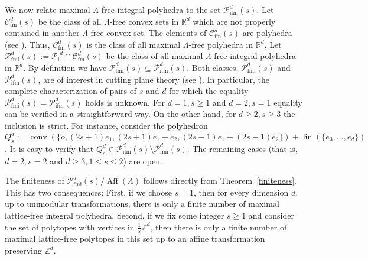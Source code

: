 \documentclass[a4paper]{article}
\theoremstyle{plain}
\begin{document}
We now relate maximal $\Lambda$-free integral polyhedra to
the set ${{\mathcal{P}}_{{\mathop{\mathrm{{ifm}}}}}^{{d}}({s})}$.
Let ${{\mathcal{C}}_{{\mathop{\mathrm{{fm}}}}}^{{d}}({s})}$ be the class of all $\Lambda$-free convex
sets in ${\mathbb{R}}^d$ which are not properly contained in
another $\Lambda$-free convex set.
The elements of ${{\mathcal{C}}_{{\mathop{\mathrm{{fm}}}}}^{{d}}({s})}$ are polyhedra (see
\cite[Proposition\,3.3]{Lovasz89}).
Thus, ${{\mathcal{C}}_{{\mathop{\mathrm{{fm}}}}}^{{d}}({s})}$ is the class of all maximal
$\Lambda$-free polyhedra in ${\mathbb{R}}^d$.
Let ${{\mathcal{P}}_{{\mathop{\mathrm{{fmi}}}}}^{{d}}({s})} := {{\mathcal{P}}_{{\mathop{\mathrm{{i}}}}}}^d \cap {{\mathcal{C}}_{{\mathop{\mathrm{{fm}}}}}^{{d}}({s})}$ be the class of
all maximal $\Lambda$-free integral polyhedra in ${\mathbb{R}}^d$.
By definition we have ${{\mathcal{P}}_{{\mathop{\mathrm{{fmi}}}}}^{{d}}({s})} \subseteq {{\mathcal{P}}_{{\mathop{\mathrm{{ifm}}}}}^{{d}}({s})}$.
Both classes, ${{\mathcal{P}}_{{\mathop{\mathrm{{fmi}}}}}^{{d}}({s})}$ and ${{\mathcal{P}}_{{\mathop{\mathrm{{ifm}}}}}^{{d}}({s})}$, are of
interest in cutting plane theory (see
\cite{DelPiaWeismantel10}).
In particular, the complete characterization of pairs of $s$
and $d$ for which the equality ${{\mathcal{P}}_{{\mathop{\mathrm{{fmi}}}}}^{{d}}({s})} = {{\mathcal{P}}_{{\mathop{\mathrm{{ifm}}}}}^{{d}}({s})}$
holds is unknown.
For $d=1, s \ge 1$ and $d=2, s=1$ equality can be verified
in a straightforward way.
On the other hand, for $d \ge 2, s \ge 3$ the inclusion is
strict.
For instance, consider the polyhedron
$Q^d_s := {{\mathop{\mathrm{{conv}}}}}(\{o, (2s+1) e_1, (2s+1) e_1 + e_2,
(2s-1) e_1 + (2s-1) e_2\}) + {{\mathop{\mathrm{{lin}}}}}(\{e_3, \dots, e_d\})$.
It is easy to verify that $Q^d_s \in {{\mathcal{P}}_{{\mathop{\mathrm{{ifm}}}}}^{{d}}({s})} \setminus
{{\mathcal{P}}_{{\mathop{\mathrm{{fmi}}}}}^{{d}}({s})}$.
The remaining cases (that is, $d=2, s=2$ and $d \ge 3, 1 \le
s \le 2$) are open.

The finiteness of ${{\mathcal{P}}_{{\mathop{\mathrm{{fmi}}}}}^{{d}}({s})} / {{\mathop{\mathrm{{Aff}}}}}(\Lambda)$ follows
directly from Theorem~\ref{finiteness}.
This has two consequences:
First, if we choose $s = 1$, then for every dimension $d$,
up to unimodular transformations, there is only a finite
number of maximal lattice-free integral polyhedra.
Second, if we fix some integer $s \ge 1$ and
consider the set of polytopes with vertices in
$\frac{1}{s} {\mathbb{Z}}^d$, then there is only a finite number
of maximal lattice-free polytopes in this set up to an
affine transformation preserving ${\mathbb{Z}}^d$. 
\end{document}
